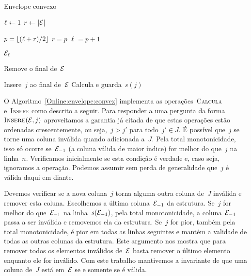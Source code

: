 \begin{algorithm}[h]
\caption{Envelope convexo}
\label{Online:envelope:convex}
\begin{algorithmic}[1]
    \State $\ell \leftarrow 1$
    \State $r \leftarrow |\mathcal{E}|$
    
        \State $p = \lfloor (\ell+r)/2 \rfloor$
            \State $r = p$
        \Else
            \State $\ell = p+1$
        \EndIf
    \EndWhile

    \State \Return $\mathcal{E}_\ell$
\EndFunction

        \State \Return
    \EndIf
    
        \State Remove o final de~$\mathcal{E}$
    \EndWhile

    \State Insere~$j$ ao final de~$\mathcal{E}$
    \State Calcula e guarda~$s(j)$
\EndFunction
\end{algorithmic}
\end{algorithm}

O Algoritmo~\ref{Online:envelope:convex} implementa as operações~\textsc{Calcula} e~\textsc{Insere} como descrito a seguir. Para responder a uma pergunta da forma~$\textsc{Insere}(\mathcal{E},j)$ aproveitamos a garantia já citada de que estas operações estão ordenadas crescentemente, ou seja,~$j > j'$ para todo~$j' \in J$. É possível que~$j$ se torne uma coluna inválida quando adicionada a~$J$. Pela total monotonicidade, isso só ocorre se~$\mathcal{E}_{-1}$ (a coluna válida de maior índice) for melhor do que~$j$ na linha~$n$. Verificamos inicialmente se esta condição é verdade e, caso seja, ignoramos a operação. Podemos assumir sem perda de generalidade que~$j$ é válida daqui em diante.

Devemos verificar se a nova coluna~$j$ torna alguma outra coluna de~$J$ inválida e remover esta coluna. Escolhemos a última coluna~$\mathcal{E}_{-1}$ da estrutura. Se~$j$ for melhor do que~$\mathcal{E}_{-1}$ na linha~$s(\mathcal{E}_{-1})$, pela total monotonicidade, a coluna~$\mathcal{E}_{-1}$ passa a ser inválida e removemos ela da estrutura. Se~$j$ for pior, também pela total monotonicidade, é pior em todas as linhas seguintes e mantém a validade de todas as outras colunas da estrutura. Este argumento nos mostra que para remover todos os elementos inválidos de~$\mathcal{E}$ basta remover o último elemento enquanto ele for inválido. Com este trabalho mantivemos a invariante de que uma coluna de~$J$ está em~$\mathcal{E}$ se e somente se é válida.

